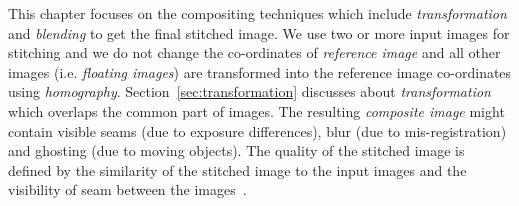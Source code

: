 This chapter focuses on the compositing techniques which include \emph{transformation} and \emph{blending} to get the final stitched image. We use two or more input images for stitching and we do not change the co-ordinates of \emph{reference image} and all other images (i.e. \emph{floating images}) are transformed into the reference image co-ordinates using \emph{homography}. Section~\ref{sec:transformation} discusses about \emph{transformation} which overlaps the common part of images. The resulting \emph{composite image} might contain visible seams (due to exposure differences), blur (due to mis-registration) and ghosting (due to moving objects). The quality of the stitched image is defined by the similarity of the stitched image to the input images and the visibility of seam between the images~\cite{levin:04}.

